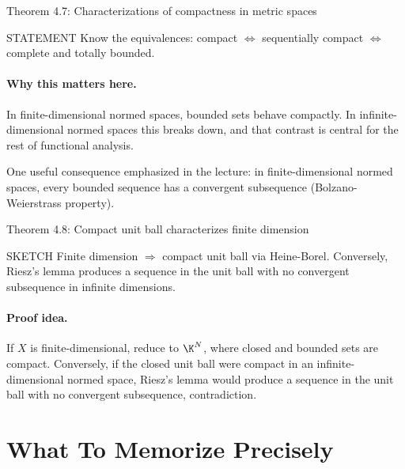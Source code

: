 \documentclass[header={Lecture 2 Exam Study Notes}]{study-note}
\begin{document}
\begin{thmbox}{Theorem 4.7: Characterizations of compactness in metric spaces}
\thmCompactEquivSequential
\end{thmbox}

\begin{prooflevelbox}{STATEMENT}
Know the equivalences: compact $\Leftrightarrow$ sequentially compact $\Leftrightarrow$ complete and totally bounded.
\end{prooflevelbox}

\paragraph{Why this matters here.}
In finite-dimensional normed spaces, bounded sets behave compactly. In infinite-dimensional normed spaces this breaks down, and that contrast is central for the rest of functional analysis.

\begin{focusbox}
One useful consequence emphasized in the lecture: in finite-dimensional normed spaces, every bounded sequence has a convergent subsequence (Bolzano-Weierstrass property).
\end{focusbox}

\begin{thmbox}{Theorem 4.8: Compact unit ball characterizes finite dimension}
\thmUnitBallCompactIffFiniteDim
\end{thmbox}

\begin{prooflevelbox}{SKETCH}
Finite dimension $\Rightarrow$ compact unit ball via Heine-Borel. Conversely, Riesz's lemma produces a sequence in the unit ball with no convergent subsequence in infinite dimensions.
\end{prooflevelbox}

\paragraph{Proof idea.}
If $X$ is finite-dimensional, reduce to $\K^N$, where closed and bounded sets are compact. Conversely, if the closed unit ball were compact in an infinite-dimensional normed space, Riesz's lemma would produce a sequence in the unit ball with no convergent subsequence, contradiction.

\section{What To Memorize Precisely}
\end{document}
